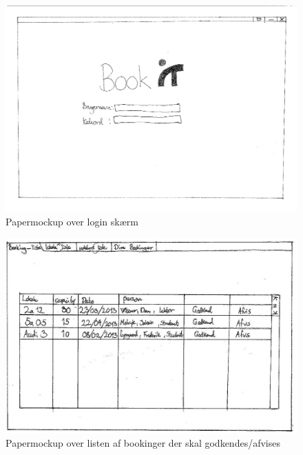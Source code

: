 \begin{figure}[h!]
  \centering
    \includegraphics[width=\textwidth]{Appendix/GUI-Prototype/PaperMockup/LogIn_001}
  \caption{Papermockup over login skærm}
\label{App_GUI_paper_LogIn}
\end{figure}

\begin{figure}[h!]
  \centering
    \includegraphics[width=\textwidth]{Appendix/GUI-Prototype/PaperMockup/GodkendBookinger_001}
  \caption{Papermockup over listen af bookinger der skal godkendes/afvises}
\label{App_GUI_paper_GodkendBookinger}
\end{figure}

